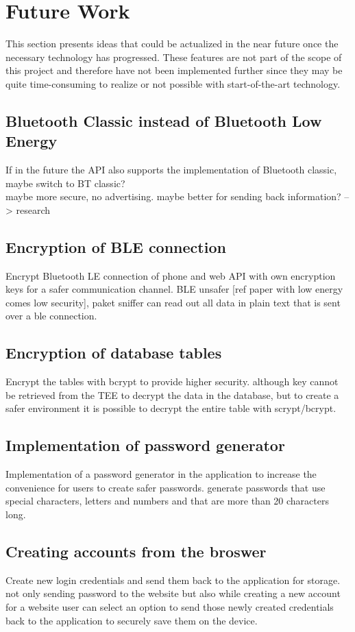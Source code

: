 \section{Future Work}
\label{futurework}


This section presents ideas that could be actualized in the near future once the necessary technology has progressed. These features are not part of the scope of this project and therefore have not been implemented further since they may be quite time-consuming to realize or not possible with start-of-the-art technology. \\


\subsection{Bluetooth Classic instead of Bluetooth Low Energy}
If in the future the API also supports the implementation of Bluetooth classic, maybe switch to BT classic? \\
maybe more secure, no advertising. maybe better for sending back information? --> research

\subsection{Encryption of BLE connection}
Encrypt Bluetooth LE connection of phone and web API with own encryption keys for a safer communication channel. BLE unsafer [ref paper with low energy comes low security], paket sniffer can read out all data in plain text that is sent over a ble connection. \\

\subsection{Encryption of database tables}
Encrypt the tables with bcrypt to provide higher security. although key cannot be retrieved from the TEE to decrypt the data in the database, but to create a safer environment it is possible to decrypt the entire table with scrypt/bcrypt.\\

\subsection{Implementation of password generator}
Implementation of a password generator in the application to increase the convenience for users to create safer passwords. generate passwords that use special characters, letters and numbers and that are more than 20 characters long. \\


\subsection{Creating accounts from the broswer}
Create new login credentials and send them back to the application for storage. not only sending password to the website but also while creating a new account for a website user can select an option to send those newly created credentials back to the application to securely save them on the device. \\


